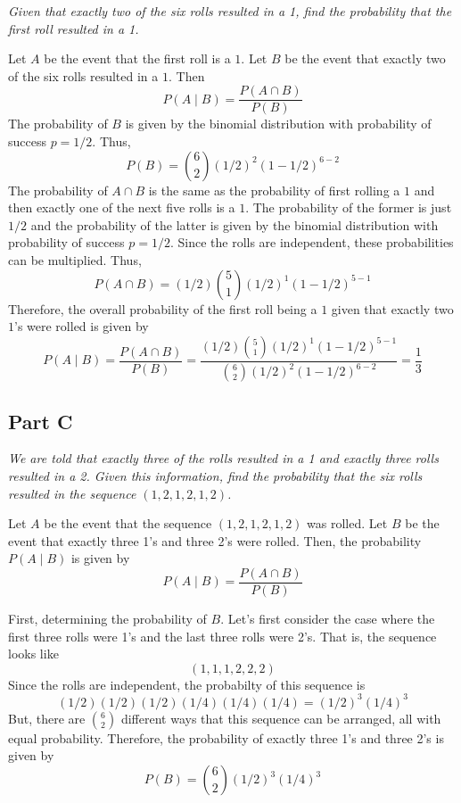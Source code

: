 \documentclass{article}
\begin{document}
\textit{Given that exactly two of the six rolls resulted in a 1, find the
probability that the first roll resulted in a 1.}

\bigbreak

Let $ A $ be the event that the first roll is a $ 1 $. Let $ B $ be the event
that exactly two of the six rolls resulted in a $ 1 $. Then
$$ P(A \mid B) = \frac{P(A \cap B)}{P(B)} $$
The probability of $ B $ is given by the binomial distribution with
probability of success $ p = 1/2 $. Thus,
$$ P(B) = \binom{6}{2} (1/2)^2 (1-1/2)^{6 - 2} $$
The probability of $ A \cap B $ is the same as the probability of first
rolling a $ 1 $ and then exactly one of the next five rolls is a $ 1 $.
The probability of the former is just $ 1/2 $ and the probability of the
latter is given by the binomial distribution with probability of success $ p
= 1/2 $. Since the rolls are independent, these probabilities can be
multiplied. Thus,
$$ P(A \cap B) = (1/2) \binom{5}{1} (1/2)^1 (1 - 1/2)^{5 - 1} $$
Therefore, the overall probability of the first roll being a $ 1 $ given that
exactly two $ 1 $'s were rolled is given by
$$ P(A \mid B) = \frac{P(A \cap B)}{P(B)} = \frac{(1/2) \binom{5}{1} (1/2)^1
(1 - 1/2)^{5 - 1}}{\binom{6}{2} (1/2)^2 (1-1/2)^{6 - 2}} = \frac{1}{3} $$

\subsection*{Part C}

\textit{We are told that exactly three of the rolls resulted in a 1 and
exactly three rolls resulted in a 2. Given this information, find the
probability that the six rolls resulted in the sequence $ (1, 2, 1, 2, 1, 2)
$.}

\bigbreak

Let $ A $ be the event that the sequence $ (1, 2, 1, 2, 1, 2) $ was rolled.
Let $ B $ be the event that exactly three 1's and three 2's were rolled. Then,
the probability $ P(A \mid B) $ is given by
$$ P(A \mid B) = \frac{P(A \cap B)}{P(B)} $$

First, determining the probability of $ B $. Let's first consider the case
where the first three rolls were 1's and the last three rolls were 2's. That
is, the sequence looks like
$$ (1, 1, 1, 2, 2, 2) $$
Since the rolls are independent, the probabilty of this sequence is
$$ (1/2)(1/2)(1/2)(1/4)(1/4)(1/4) = (1/2)^3 (1/4)^3 $$
But, there are $ \binom{6}{2} $ different ways that this sequence can be
arranged, all with equal probability. Therefore, the probability of exactly
three 1's and three 2's is given by
$$ P(B) = \binom{6}{2} (1/2)^3 (1/4)^3 $$
\end{document}
